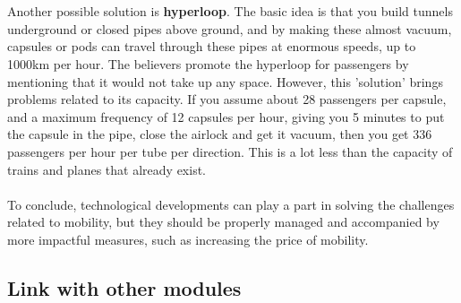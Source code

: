 \documentclass[../summary.tex]{subfiles}
\begin{document}
	 \\\\
	 Another possible solution is \textbf{hyperloop}. The basic idea is that you build tunnels underground or closed pipes above ground, and by making these almost vacuum, capsules or pods can travel through these pipes at enormous speeds, up to 1000km per hour. The believers promote the hyperloop for passengers by mentioning that it would not take up any space. However, this 'solution' brings problems related to its capacity. If you assume about 28 passengers per capsule, and a maximum frequency of 12 capsules per hour, giving you 5 minutes to put the capsule in the pipe, close the airlock and get it vacuum, then you get 336 passengers per hour per tube per direction. This is a lot less than the capacity of trains and planes that already exist. 
	 \\\\
	 To conclude, technological developments can play a part in solving the challenges related to mobility, but they should be properly managed and accompanied by more impactful measures, such as increasing the price of mobility.
	\newpage
	
	\subsection{Link with other modules}
	
\end{document}
